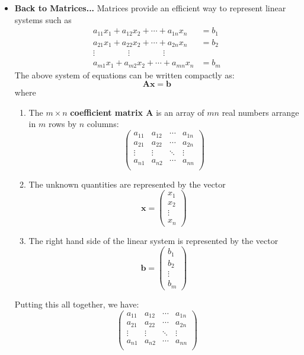 \documentclass[11pt]{article}
\theoremstyle{definition}
\theoremstyle{remark}
\begin{document}
\begin{itemize}
\item \textbf{Back to Matrices...} Matrices provide an efficient way to represent linear systems such as 
\begin{equation*}
\begin{split}
a_{11} x_1 + a_{12} x_2 + \cdots + a_{1n} x_n &= b_1 \\
a_{21} x_1 + a_{22} x_2 + \cdots + a_{2n} x_n &= b_2 \\
\vdots \quad  \quad \quad \quad \vdots \quad \quad \quad \quad \vdots \\
a_{m1} x_1 + a_{m2} x_2 + \cdots + a_{mn} x_n &= b_m  \label{eq:genlinsys}
\end{split}
\end{equation*}
The above system of equations can be written compactly as:
$$
\mathbf{Ax = b}
$$
where
\begin{enumerate}
\item The $m \times n$ \textbf{coefficient matrix A} is an array of $mn$ real numbers arrange in $m$ rows by $n$ columns:
$$
\begin{pmatrix}
a_{11}&a_{12}&\cdots&a_{1n} \\
a_{21}&a_{22}&\cdots&a_{2n} \\
\vdots&\vdots&\ddots&\vdots \\
a_{n1}&a_{n2}&\cdots&a_{nn} \\
\end{pmatrix}
$$
\item The unknown quantities are represented by the vector 
$$
\mathbf{x} =
\begin{pmatrix}
x_1 \\
x_2 \\
\vdots \\
x_n
\end{pmatrix}$$
\item The right hand side of the linear system is represented by the vector 
$$
\mathbf{b} =
\begin{pmatrix}
b_1 \\
b_2 \\
\vdots \\
b_m
\end{pmatrix}
$$
\end{enumerate}
Putting this all together, we have:
$$
\begin{pmatrix}
a_{11}&a_{12}&\cdots&a_{1n} \\
a_{21}&a_{22}&\cdots&a_{2n} \\
\vdots&\vdots&\ddots&\vdots \\
a_{n1}&a_{n2}&\cdots&a_{nn} \\

\end{pmatrix}$$
\end{itemize}
\end{document}
